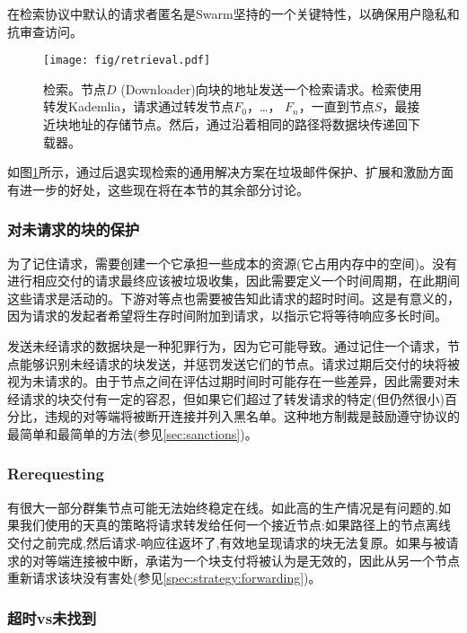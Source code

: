 在检索协议中默认的请求者匿名是Swarm坚持的一个关键特性，以确保用户隐私和抗审查访问。

\begin{figure}[htbp]
   \centering
   \texttt{[image: fig/retrieval.pdf]}
   \caption[检索\statusgreen]{检索。节点$D$ (Downloader)向块的地址发送一个检索请求。检索使用转发Kademlia，请求通过转发节点$F_0$，…， $F_n$，一直到节点$S$，最接近块地址的存储节点。然后，通过沿着相同的路径将数据块传递回下载器。}
   \label{fig:retrieval}
\end{figure}

如图\ref{fig:retrieval}所示，通过后退实现检索的通用解决方案在垃圾邮件保护、扩展和激励方面有进一步的好处，这些现在将在本节的其余部分讨论。

\subsubsection{对未请求的块的保护}

为了记住请求，需要创建一个它承担一些成本的资源(它占用内存中的空间)。没有进行相应交付的请求最终应该被垃圾收集，因此需要定义一个时间周期，在此期间这些请求是活动的。下游对等点也需要被告知此请求的超时时间。这是有意义的，因为请求的发起者希望将生存时间附加到请求，以指示它将等待响应多长时间。

发送未经请求的数据块是一种犯罪行为，因为它可能导致。通过记住一个请求，节点能够识别未经请求的块发送，并惩罚发送它们的节点。请求过期后交付的块将被视为未请求的。由于节点之间在评估过期时间时可能存在一些差异，因此需要对未经请求的块交付有一定的容忍，但如果它们超过了转发请求的特定(但仍然很小)百分比，违规的对等端将被断开连接并列入黑名单。这种地方制裁是鼓励遵守协议的最简单和最简单的方法(参见\ref{sec:sanctions})。 

\subsubsection{Rerequesting}

有很大一部分群集节点可能无法始终稳定在线。如此高的生产情况是有问题的,如果我们使用的天真的策略将请求转发给任何一个接近节点:如果路径上的节点离线交付之前完成,然后请求-响应往返坏了,有效地呈现请求的块无法复原。如果与被请求的对等端连接被中断，承诺为一个块支付将被认为是无效的，因此从另一个节点重新请求该块没有害处(参见\ref{spec:strategy:forwarding})。


\subsubsection{超时vs未找到}

